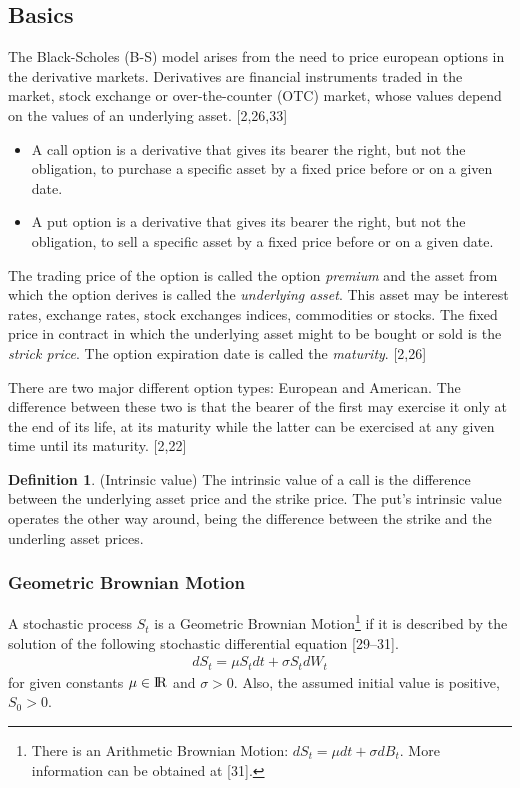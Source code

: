 \documentclass[12pt,twoside]{reedthesis}
\theoremstyle{definition}
\newtheorem{definition}{Definition}[section]
\theoremstyle{definition}
\theoremstyle{remark}
\begin{document}
  \subsection{Basics}\label{basics}
  
  The Black-Scholes (B-S) model arises from the need to price european
  options in the derivative markets. Derivatives are financial instruments
  traded in the market, stock exchange or over-the-counter (OTC) market,
  whose values depend on the values of an underlying asset. {[}2,26,33{]}
  \begin{itemize}
  \item
    A call option is a derivative that gives its bearer the right, but not
    the obligation, to purchase a specific asset by a fixed price before
    or on a given date.
  \item
    A put option is a derivative that gives its bearer the right, but not
    the obligation, to sell a specific asset by a fixed price before or on
    a given date.
  \end{itemize}
  The trading price of the option is called the option \emph{premium} and
  the asset from which the option derives is called the \emph{underlying
  asset}. This asset may be interest rates, exchange rates, stock
  exchanges indices, commodities or stocks. The fixed price in contract in
  which the underlying asset might to be bought or sold is the
  \emph{strick price}. The option expiration date is called the
  \emph{maturity}. {[}2,26{]}
  
  There are two major different option types: European and American. The
  difference between these two is that the bearer of the first may
  exercise it only at the end of its life, at its maturity while the
  latter can be exercised at any given time until its maturity. {[}2,22{]}
  \begin{definition}{(Intrinsic value)} 
  The intrinsic value of a call is the difference between the underlying asset price and the strike price. The put's intrinsic value operates the other way around, being the difference between the strike and the underling asset prices.
  \end{definition}
  \subsubsection{Geometric Brownian Motion}\label{gbm}
  
  A stochastic process \(S_t\) is a Geometric Brownian Motion\footnote{There
    is an Arithmetic Brownian Motion: \(dS_t = \mu dt + \sigma dB_t\).
    More information can be obtained at {[}31{]}.} if it is described by
  the solution of the following stochastic differential equation
  {[}29--31{]}.
  \begin{align}
  dS_t = \mu S_t dt + \sigma S_t dW_t
  \end{align}
  \noindent
  for given constants \(\mu \in {\rm I\!R}\) and \(\sigma > 0\). Also, the
  assumed initial value is positive, \(S_0 >0\).
  
\end{document}
